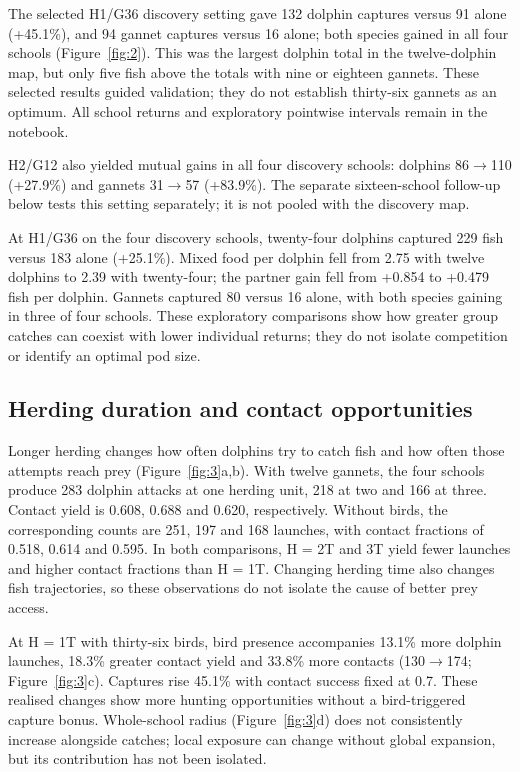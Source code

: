 \documentclass[10pt,a4paper,twocolumn]{article}
\begin{document}
The selected H1/G36 discovery setting gave 132 dolphin captures versus 91 alone (+45.1\%), and 94 gannet captures versus 16 alone; both species gained in all four schools (Figure~\ref{fig:2}). This was the largest dolphin total in the twelve-dolphin map, but only five fish above the totals with nine or eighteen gannets. These selected results guided validation; they do not establish thirty-six gannets as an optimum. All school returns and exploratory pointwise intervals remain in the notebook.

H2/G12 also yielded mutual gains in all four discovery schools: dolphins 86\ensuremath{\rightarrow}110 (+27.9\%) and gannets 31\ensuremath{\rightarrow}57 (+83.9\%). The separate sixteen-school follow-up below tests this setting separately; it is not pooled with the discovery map.

At H1/G36 on the four discovery schools, twenty-four dolphins captured 229 fish versus 183 alone (+25.1\%). Mixed food per dolphin fell from 2.75 with twelve dolphins to 2.39 with twenty-four; the partner gain fell from +0.854 to +0.479 fish per dolphin. Gannets captured 80 versus 16 alone, with both species gaining in three of four schools. These exploratory comparisons show how greater group catches can coexist with lower individual returns; they do not isolate competition or identify an optimal pod size.

\subsection{Herding duration and contact opportunities}
Longer herding changes how often dolphins try to catch fish and how often those attempts reach prey (Figure~\ref{fig:3}a,b). With twelve gannets, the four schools produce 283 dolphin attacks at one herding unit, 218 at two and 166 at three. Contact yield is 0.608, 0.688 and 0.620, respectively. Without birds, the corresponding counts are 251, 197 and 168 launches, with contact fractions of 0.518, 0.614 and 0.595. In both comparisons, H = 2T and 3T yield fewer launches and higher contact fractions than H = 1T. Changing herding time also changes fish trajectories, so these observations do not isolate the cause of better prey access.

At H = 1T with thirty-six birds, bird presence accompanies 13.1\% more dolphin launches, 18.3\% greater contact yield and 33.8\% more contacts (130\ensuremath{\rightarrow}174; Figure~\ref{fig:3}c). Captures rise 45.1\% with contact success fixed at 0.7. These realised changes show more hunting opportunities without a bird-triggered capture bonus. Whole-school radius (Figure~\ref{fig:3}d) does not consistently increase alongside catches; local exposure can change without global expansion, but its contribution has not been isolated.
\end{document}
